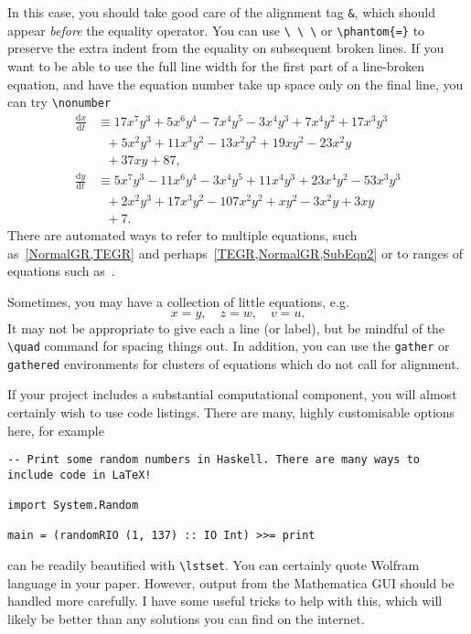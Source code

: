 \documentclass[aps,prd,reprint,preprintnumbers,showpacs,floatfix,nofootinbib,superscript address]{revtex4-2}
\begin{document}
In this case, you should take good care of the alignment tag \texttt{\&}, which should appear \emph{before} the equality operator. You can use \texttt{\textbackslash\ \textbackslash\ \textbackslash} or \texttt{\textbackslash phantom\{=\}} to preserve the extra indent from the equality on subsequent broken lines. If you want to be able to use the full line width for the first part of a line-broken equation, and have the equation number take up space only on the final line, you can try \texttt{\textbackslash nonumber}
\begin{subequations}
\begin{align}
	\frac{\mathrm{d}x}{\mathrm{d}t}&\equiv 17x^7y^3+5x^6y^4-7x^4y^5-3x^4y^3+7x^4y^2+17x^3y^3\nonumber\\
	&\ \ \ +5x^2y^3+11x^3y^2-13x^2y^2+19xy^2-23x^2y\nonumber\\
	&\ \ \ +37xy+87,\label{SubEqn1}\\
	\frac{\mathrm{d}y}{\mathrm{d}t}&\equiv 5x^7y^3-11x^6y^4-3x^4y^5+11x^4y^3+23x^4y^2-53x^3y^3\nonumber\\
	&\ \ \ +2x^2y^3+17x^3y^2-107x^2y^2+xy^2-3x^2y+3xy\nonumber\\
	&\ \ \ +7.\label{SubEqn2}
\end{align}
\end{subequations}
There are automated ways to refer to multiple equations, such as~\cref{NormalGR,TEGR} and perhaps~\cref{TEGR,NormalGR,SubEqn2} or to ranges of equations such as~.

Sometimes, you may have a collection of little equations, e.g.
\begin{equation}
	x=y, \quad z=w, \quad v=u.
\end{equation}
It may not be appropriate to give each a line (or label), but be mindful of the \texttt{\textbackslash quad} command for spacing things out. In addition, you can use the \texttt{gather} or \texttt{gathered} environments for clusters of equations which do not call for alignment.

If your project includes a substantial computational component, you will almost certainly wish to use code listings. There are many, highly customisable options here, for example
\begin{widetext}
\lstset{language=Haskell}
\begin{lstlisting}
-- Print some random numbers in Haskell. There are many ways to include code in LaTeX!

import System.Random

main = (randomRIO (1, 137) :: IO Int) >>= print
\end{lstlisting}
\end{widetext}
can be readily beautified with \texttt{\textbackslash lstset}. You can certainly quote Wolfram language in your paper. However, output from the Mathematica GUI should be handled more carefully. I have some useful tricks to help with this, which will likely be better than any solutions you can find on the internet.
\end{document}
